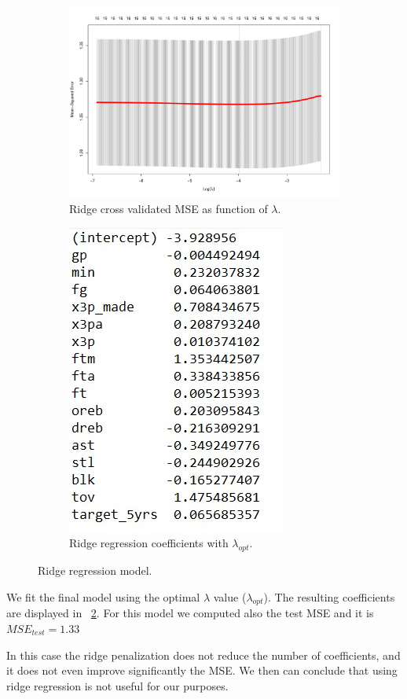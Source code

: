 \begin{figure}[h]
	\centering
	\begin{subfigure}{.6\textwidth}
		\centering
		\includegraphics[width=0.7\linewidth]{ImageFiles/Regression/Ridge/RidgeCvPlot}
		\caption{Ridge cross validated MSE as function of $\lambda$.}
		\label{fig:RidgeCvPlot}
	\end{subfigure}%
	\begin{subfigure}{.6\textwidth}
		\centering
		\includegraphics[width=0.4\linewidth]{ImageFiles/Regression/Ridge/FinalRidgeCoef}
		\caption{Ridge regression coefficients with $\lambda_{opt}$.}
		\label{fig:FinalRidgeCoef}
	\end{subfigure}
	\caption{Ridge regression model.}
	\label{fig:FinalRidgeModel}
\end{figure}

We fit the final model using the optimal $\lambda$ value ($\lambda_{opt}$). The resulting coefficients are displayed in \Fig~\ref{fig:FinalRidgeCoef}. For this model we computed also the test MSE and it is $MSE_{test} = 1.33$

In this case the ridge penalization does not reduce the number of coefficients, and it does not even improve significantly the MSE. We then can conclude that using ridge regression is not useful for our purposes.
